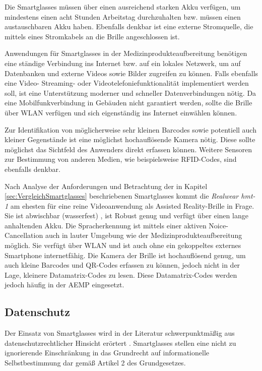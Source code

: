 Die Smartglasses müssen über einen ausreichend starken Akku verfügen, um mindestens einen acht Stunden Arbeitstag durchzuhalten bzw. müssen einen austauschbaren Akku haben. Ebenfalls denkbar ist eine externe Stromquelle, die mittels eines Stromkabels an die Brille angeschlossen ist.

Anwendungen für Smartglasses in der Medizinprodukteaufbereitung benötigen eine ständige Verbindung ins Internet bzw. auf ein lokales Netzwerk, um auf Datenbanken und externe Videos sowie Bilder zugreifen zu können. Falls ebenfalls eine Video- Streaming- oder Videotelefoniefunktionalität implementiert werden soll, ist eine Unterstützung moderner und schneller Datenverbindungen nötig. Da eine Mobilfunkverbindung in Gebäuden nicht garantiert werden, sollte die Brille über WLAN verfügen und sich eigenständig ins Internet einwählen können.

Zur Identifikation von möglicherweise sehr kleinen Barcodes sowie potentiell auch kleiner Gegenstände ist eine möglichst hochauflösende Kamera nötig. Diese sollte möglichst das Sichtfeld des Anwenders direkt erfassen können. Weitere Sensoren zur Bestimmung von anderen Medien, wie beispielsweise RFID-Codes, sind ebenfalls denkbar.
%
%

Nach Analyse der Anforderungen und Betrachtung der in Kapitel \ref{sec:VergleichSmartglasses} beschriebenen Smartglasses kommt die \emph{Realwear hmt-1} am ehesten für eine reine Videoanwendung als Assisted Reality-Brille in Frage. Sie ist abwischbar (wasserfest)
%
%
, ist Robust genug und verfügt über einen lange anhaltenden Akku. Die Spracherkennung ist mittels einer aktiven Noice-Cancellation auch in lauter Umgebung wie der Medizinprodukteaufbereitung möglich. Sie verfügt über WLAN und ist auch ohne ein gekoppeltes externes Smartphone internetfähig. Die Kamera der Brille ist hochauflösend genug, um auch kleine Barcodes und QR-Codes erfassen zu können, jedoch nicht in der Lage, kleinere Datamatrix-Codes zu lesen. Diese Datamatrix-Codes werden jedoch häufig in der AEMP eingesetzt. 
%
%
%
%
%
%
%
\subsection{Datenschutz}
\label{sec:Datenschutz}
Der Einsatz von Smartglasses wird in der Literatur schwerpunktmäßig aus datenschutzrechtlicher Hinsicht erörtert \cite{Berkemeier2017}. Smartglasses stellen eine nicht zu ignorierende Einschränkung in das Grundrecht auf informationelle Selbstbestimmung dar gemäß Artikel 2 des Grundgesetzes.

